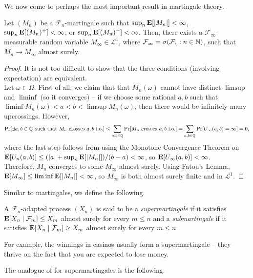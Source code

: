 We now come to perhaps the most important result in martingale theory.

\begin{ftheo}
	\label{martingale convergence theorem}
	Let $(M_n)$ be a $\mathcal{F}_n$-martingale such that $\sup_n\textbf{E}[|M_n|]<\infty$, $\sup_n\textbf{E}[(M_n)^+]<\infty$, or $\sup_n\textbf{E}[(M_n)^-]<\infty$. Then, there exists a $\mathcal{F}_\infty$-measurable random variable $M_\infty\in\mathcal{L}^1$, where $\mathcal{F}_\infty = \sigma(\mathcal{F_n} : n\in\mathbb{N})$, such that $M_n\to M_\infty$ almost surely.
\end{ftheo}
\begin{proof}
	It is not too difficult to show that the three conditions (involving expectation) are equivalent.\\
	Let $\omega\in\Omega$. First of all, we claim that that $M_n(\omega)$ cannot have distinct $\limsup$ and $\liminf$ (so it converges) -- if we choose some rational $a,b$ such that $\liminf M_n(\omega)<a<b<\limsup M_n(\omega)$, then there would be infinitely many upcrossings. However,
	\[ \Pr[\exists a,b\in\mathbb{Q}\text{ such that $M_n$ crosses $a,b$ i.o.}] \leq \sum_{a,b\in\mathbb{Q}} \Pr[M_n\text{ crosses $a,b$ i.o.}] = \sum_{a,b\in\mathbb{Q}}\Pr[U_\infty(a,b)=\infty] = 0, \]
	where the last step follows from using the Monotone Convergence Theorem on $\textbf{E}[U_n(a,b)] \leq (|a|+\sup_n\textbf{E}[|M_n|])/(b-a) < \infty$, so $\textbf{E}[U_\infty(a,b)]<\infty$.\\
	Therefore, $M_n$ converges to some $M_\infty$ almost surely. Using Fatou's Lemma, $\textbf{E}[M_\infty] \leq \liminf \textbf{E}[|M_n|] < \infty$, so $M_\infty$ is both almost surely finite and in $\mathcal{L}^1$.
\end{proof}

Similar to martingales, we define the following.

\begin{definition}
	A $\mathcal{F}_n$-adapted process $(X_n)$ is said to be a \textit{supermartingale} if it satisfies $\textbf{E}[X_n\mid\mathcal{F}_m] \leq X_m$ almost surely for every $m\leq n$ and a \textit{submartingale} if it satisfies $\textbf{E}[X_n\mid\mathcal{F}_m] \geq X_m$ almost surely for every $m\leq n$. 
\end{definition}

For example, the winnings in casinos usually form a supermartingale -- they thrive on the fact that you are expected to lose money.

The analogue of  for supermartingales is the following.

